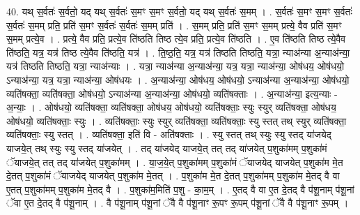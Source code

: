 \documentclass[17pt]{extarticle}
\begin{document}
40. यथ् स॒र्वतः॑ स॒र्वतो॒ यद् यथ् स॒र्वतः॑ स॒मꣳ स॒मꣳ स॒र्वतो॒ यद् यथ् स॒र्वतः॑ स॒मम् । . स॒र्वतः॑ स॒मꣳ स॒मꣳ स॒र्वतः॑ स॒र्वतः॑ स॒मम् प्रति॒ प्रति॑ स॒मꣳ स॒र्वतः॑ स॒र्वतः॑ स॒मम् प्रति॑ । . स॒मम् प्रति॒ प्रति॑ स॒मꣳ स॒मम् प्रत्ये॒ वैव प्रति॑ स॒मꣳ स॒मम् प्रत्ये॒व । . प्रत्ये॒ वैव प्रति॒ प्रत्ये॒व ति॑ष्ठति तिष्ठ त्ये॒व प्रति॒ प्रत्ये॒व ति॑ष्ठति । . ए॒व ति॑ष्ठति तिष्ठ त्ये॒वैव ति॑ष्ठति॒ यत्र॒ यत्र॑ तिष्ठ त्ये॒वैव ति॑ष्ठति॒ यत्र॑ । . ति॒ष्ठ॒ति॒ यत्र॒ यत्र॑ तिष्ठति तिष्ठति॒ यत्रा॒ न्या‌अ॑न्या अ॒न्या‌अ॑न्या॒ यत्र॑ तिष्ठति तिष्ठति॒ यत्रा॒ न्या‌अ॑न्याः । . यत्रा॒ न्या‌अ॑न्या अ॒न्या‌अ॑न्या॒ यत्र॒ यत्रा॒ न्या‌अ॑न्या॒ ओष॑धय॒ ओष॑धयो॒ ऽन्या‌अ॑न्या॒ यत्र॒ यत्रा॒ न्या‌अ॑न्या॒ ओष॑धयः । . अ॒न्या‌अ॑न्या॒ ओष॑धय॒ ओष॑धयो॒ ऽन्या‌अ॑न्या अ॒न्या‌अ॑न्या॒ ओष॑धयो॒ व्यति॑षक्ता॒ व्यति॑षक्ता॒ ओष॑धयो॒ ऽन्या‌अ॑न्या अ॒न्या‌अ॑न्या॒ ओष॑धयो॒ व्यति॑षक्ताः । . अ॒न्या‌अ॑न्या॒ इत्य॒न्याः - अ॒न्याः॒ । . ओष॑धयो॒ व्यति॑षक्ता॒ व्यति॑षक्ता॒ ओष॑धय॒ ओष॑धयो॒ व्यति॑षक्ताः॒ स्युः स्युर् व्यति॑षक्ता॒ ओष॑धय॒ ओष॑धयो॒ व्यति॑षक्ताः॒ स्युः । . व्यति॑षक्ताः॒ स्युः स्युर् व्यति॑षक्ता॒ व्यति॑षक्ताः॒ स्यु स्तत् तथ् स्युर् व्यति॑षक्ता॒ व्यति॑षक्ताः॒ स्यु स्तत् । . व्यति॑षक्ता॒ इति॑ वि - अति॑षक्ताः । . स्यु स्तत् तथ् स्युः स्यु स्तद् या॑जयेद् याजये॒त् तथ् स्युः स्यु स्तद् या॑जयेत् । . तद् या॑जयेद् याजये॒त् तत् तद् या॑जयेत् प॒शुका॑मम् प॒शुका॑मं ॅयाजये॒त् तत् तद् या॑जयेत् प॒शुका॑मम् । . या॒ज॒ये॒त् प॒शुका॑मम् प॒शुका॑मं ॅयाजयेद् याजयेत् प॒शुका॑म मे॒त दे॒तत् प॒शुका॑मं ॅयाजयेद् याजयेत् प॒शुका॑म मे॒तत् । . प॒शुका॑म मे॒त दे॒तत् प॒शुका॑मम् प॒शुका॑म मे॒तद् वै वा ए॒तत् प॒शुका॑मम् प॒शुका॑म मे॒तद् वै । . प॒शुका॑म॒मिति॑ प॒शु - का॒म॒म् । . ए॒तद् वै वा ए॒त दे॒तद् वै प॑शू॒नाम् प॑शू॒नां ॅवा ए॒त दे॒तद् वै प॑शू॒नाम् । . वै प॑शू॒नाम् प॑शू॒नां ॅवै वै प॑शू॒नाꣳ रू॒पꣳ रू॒पम् प॑शू॒नां ॅवै वै प॑शू॒नाꣳ रू॒पम् । \newline
\end{document}
